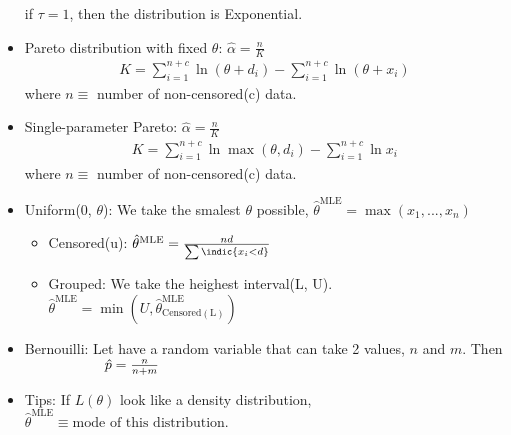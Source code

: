\documentclass[10pt, french]{article}
\begin{document}
\begin{multicols*}{3}
\begin{itemize}[align=left,leftmargin=*]
    if $\tau=1$, then the distribution is Exponential.
    \item Pareto distribution with fixed $\theta$: $\hat{\alpha} = \frac{n}{K}$
    \begin{align*}
      K = \sum_{i=1}^{n+c} \ln(\theta+d_i) - \sum_{i=1}^{n+c} \ln(\theta+x_i)
    \end{align*}
    where $n\equiv$ number of non-censored(c) data.
    \item Single-parameter Pareto: $\hat{\alpha} = \frac{n}{K}$
    \begin{align*}
      K = \sum_{i=1}^{n+c} \ln \max(\theta, d_i) - \sum_{i=1}^{n+c} \ln x_i
    \end{align*}
    where $n\equiv$ number of non-censored(c) data.
    \item Uniform(0, $\theta$): We take the smalest $\theta$ possible, $\hat{\theta}^{\mathrm{MLE}} = \max(x_1,...,x_n)$
    \begin{itemize}
        \item Censored(u): $\hat{\theta}^{\mathrm{MLE}} = \frac{n d}{\sum \indic{x_i < d }}$
        \item Grouped: We take the heighest interval(L, U). $\hat{\theta}^{\mathrm{MLE}} = \min(U, \hat{\theta}^{\mathrm{MLE}}_{\mathrm{Censored(L)}}) $
    \end{itemize}
    \item Bernouilli: Let have a random variable that can take 2 values, $n$ and $m$. Then \\
    $\hspace*{2cm} \hat{p} = \frac{n}{n+m}$
    \item Tips: If $L(\theta)$ look like a density distribution, $\hat{\theta}^{\mathrm{MLE}}\equiv\text{mode of this distribution}$.
\end{itemize}


\end{multicols*}
\end{document}
